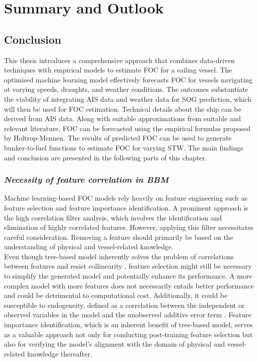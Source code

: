 \chapter{Summary and Outlook} \label{chp:outlook}

\section{Conclusion}\label{sec:conclusion}

This thesis introduces a comprehensive approach that combines data-driven techniques with empirical models to estimate FOC for a sailing vessel. The optimised machine learning model effectively forecasts FOC for vessels navigating at varying speeds, draughts, and weather conditions. The outcomes substantiate the viability of integrating AIS data and weather data for SOG prediction, which will then be used for FOC estimation. Technical details about the ship can be derived from AIS data. Along with suitable approximations from suitable and relevant literature, FOC can be forecasted using the empirical formulas proposed by Holtrop-Mennen. The results of predicted FOC can be used to generate bunker-to-fuel functions to estimate FOC for varying STW. The main findings and conclusion are presented in the following parts of this chapter.\\

\subsection*{\emph{Necessity of feature correlation in BBM}}

Machine learning-based FOC models rely heavily on feature engineering such as feature selection and feature importance identification. A prominent approach is the high correlation filter analysis, which involves the identification and elimination of highly correlated features. However, applying this filter necessitates careful consideration. Removing a feature should primarily be based on the understanding of physical and vessel-related knowledge.\\

Even though tree-based model inherently solves the problem of correlations between features and resist collinearity , feature selection might still be necessary to simplify the generated model and potentially enhance its performance. A more complex model with more features does not necessarily entails better performance and could be detrimental to computational cost. Additionally, it could be susceptible to endogeneity, defined as a correlation between the independent or observed variables in the model and the unobserved additive error term . Feature importance identification, which is an inherent benefit of tree-based model, serves as a valuable approach not only for conducting post-training feature selection but also for verifying the model's alignment with the domain of physical and vessel-related knowledge thereafter.\\ 

